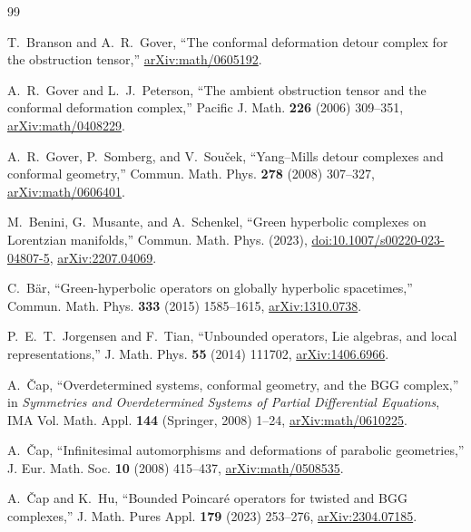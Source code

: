 \documentclass[11pt]{article}
\theoremstyle{definition}
\theoremstyle{remark}
\begin{document}
\begin{thebibliography}{99}

T.~Branson and A.~R.~Gover,
``The conformal deformation detour complex for the obstruction tensor,''
\href{https://arxiv.org/abs/math/0605192}{arXiv:math/0605192}.

A.~R.~Gover and L.~J.~Peterson,
``The ambient obstruction tensor and the conformal deformation complex,''
Pacific J. Math. \textbf{226} (2006) 309--351,
\href{https://arxiv.org/abs/math/0408229}{arXiv:math/0408229}.

A.~R.~Gover, P.~Somberg, and V.~Sou\v{c}ek,
``Yang--Mills detour complexes and conformal geometry,''
Commun. Math. Phys. \textbf{278} (2008) 307--327,
\href{https://arxiv.org/abs/math/0606401}{arXiv:math/0606401}.

M.~Benini, G.~Musante, and A.~Schenkel,
``Green hyperbolic complexes on Lorentzian manifolds,''
Commun. Math. Phys. (2023),
\href{https://doi.org/10.1007/s00220-023-04807-5}{doi:10.1007/s00220-023-04807-5},
\href{https://arxiv.org/abs/2207.04069}{arXiv:2207.04069}.

C.~B\"ar,
``Green-hyperbolic operators on globally hyperbolic spacetimes,''
Commun. Math. Phys. \textbf{333} (2015) 1585--1615,
\href{https://arxiv.org/abs/1310.0738}{arXiv:1310.0738}.

P.~E.~T.~Jorgensen and F.~Tian,
``Unbounded operators, Lie algebras, and local representations,''
J. Math. Phys. \textbf{55} (2014) 111702,
\href{https://arxiv.org/abs/1406.6966}{arXiv:1406.6966}.

A.~\v{C}ap,
``Overdetermined systems, conformal geometry, and the BGG complex,''
in \emph{Symmetries and Overdetermined Systems of Partial Differential
Equations}, IMA Vol. Math. Appl. \textbf{144} (Springer, 2008) 1--24,
\href{https://arxiv.org/abs/math/0610225}{arXiv:math/0610225}.

A.~\v{C}ap,
``Infinitesimal automorphisms and deformations of parabolic geometries,''
J. Eur. Math. Soc. \textbf{10} (2008) 415--437,
\href{https://arxiv.org/abs/math/0508535}{arXiv:math/0508535}.

A.~\v{C}ap and K.~Hu,
``Bounded Poincar\'e operators for twisted and BGG complexes,''
J. Math. Pures Appl. \textbf{179} (2023) 253--276,
\href{https://arxiv.org/abs/2304.07185}{arXiv:2304.07185}.


\end{thebibliography}
\end{document}
